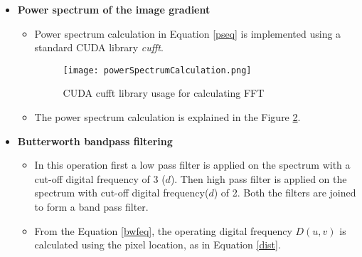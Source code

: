 \begin{itemize}
\begin{itemize}
	\item As shown in Figure \ref{fig:imgradient}, a block of threads with size 16x8 is proposed for computing gradient. This block configuration has given good speed up unlike other configurations. The grid size in the GPU can be calculated as,\\
	\begin{equation}\label{grid-blockeq}
	\begin{split}
		\text{grid dimension in  x direction} &= \text{image width}/\text{block dimension in x direction} \\
		\text{grid dimension in  y direction} &= \text{image height}/\text{block dimension in y direction}
	\end{split}
	\end{equation}
	\item For an image of size 640x480 , a grid of size 40x60 is created to compute all the gradient outputs.	
	\begin{figure}[h!]
		\centering
		\texttt{[image: imageGradient.png]}
		\caption{Thread access pattern for a kernel which finds image gradient on a image of size 640x480}
		\label{fig:imgradient}
	\end{figure}	
\end{itemize}
	\item \textbf{Power spectrum of the image gradient}
\begin{itemize}
	\item Power spectrum calculation in Equation \ref{pseq} is implemented using a standard CUDA library \textit{cufft}.
\begin{figure}[h!]
		\centering
		\texttt{[image: powerSpectrumCalculation.png]}
		\caption{CUDA cufft library usage for calculating FFT}
		\label{fig:cufft}
\end{figure}
	\item The power spectrum calculation is explained in the Figure \ref{fig:cufft}. 
\end{itemize}
\item \textbf{Butterworth bandpass filtering}
\begin{itemize}
	\item In this operation first a low pass filter is applied on the spectrum with a cut-off digital frequency of 3 ($d$). Then high pass filter is applied on the spectrum with cut-off digital frequency($d$) of 2. Both the filters are joined to form a band pass filter.
	\item From the Equation \ref{bwfeq}, the operating digital frequency $D(u,v)$ is calculated using the pixel location, as in Equation \ref{dist}. 

\end{itemize}
\end{itemize}
